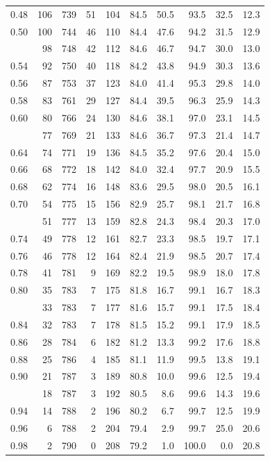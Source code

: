 \documentclass[
  11pt,
  letterpaper,
]{book}
\theoremstyle{definition}
\theoremstyle{definition}
\theoremstyle{definition}
\theoremstyle{remark}
\begin{document}
\begin{longtable}{rrrrrrrrrr}
0.48 & 106 & 739 & 51 & 104 & 84.5 & 50.5 & 93.5 & 32.5 & 12.3\\
0.50 & 100 & 744 & 46 & 110 & 84.4 & 47.6 & 94.2 & 31.5 & 12.9\\
\addlinespace
0.52 & 98 & 748 & 42 & 112 & 84.6 & 46.7 & 94.7 & 30.0 & 13.0\\
0.54 & 92 & 750 & 40 & 118 & 84.2 & 43.8 & 94.9 & 30.3 & 13.6\\
0.56 & 87 & 753 & 37 & 123 & 84.0 & 41.4 & 95.3 & 29.8 & 14.0\\
0.58 & 83 & 761 & 29 & 127 & 84.4 & 39.5 & 96.3 & 25.9 & 14.3\\
0.60 & 80 & 766 & 24 & 130 & 84.6 & 38.1 & 97.0 & 23.1 & 14.5\\
\addlinespace
0.62 & 77 & 769 & 21 & 133 & 84.6 & 36.7 & 97.3 & 21.4 & 14.7\\
0.64 & 74 & 771 & 19 & 136 & 84.5 & 35.2 & 97.6 & 20.4 & 15.0\\
0.66 & 68 & 772 & 18 & 142 & 84.0 & 32.4 & 97.7 & 20.9 & 15.5\\
0.68 & 62 & 774 & 16 & 148 & 83.6 & 29.5 & 98.0 & 20.5 & 16.1\\
0.70 & 54 & 775 & 15 & 156 & 82.9 & 25.7 & 98.1 & 21.7 & 16.8\\
\addlinespace
0.72 & 51 & 777 & 13 & 159 & 82.8 & 24.3 & 98.4 & 20.3 & 17.0\\
0.74 & 49 & 778 & 12 & 161 & 82.7 & 23.3 & 98.5 & 19.7 & 17.1\\
0.76 & 46 & 778 & 12 & 164 & 82.4 & 21.9 & 98.5 & 20.7 & 17.4\\
0.78 & 41 & 781 & 9 & 169 & 82.2 & 19.5 & 98.9 & 18.0 & 17.8\\
0.80 & 35 & 783 & 7 & 175 & 81.8 & 16.7 & 99.1 & 16.7 & 18.3\\
\addlinespace
0.82 & 33 & 783 & 7 & 177 & 81.6 & 15.7 & 99.1 & 17.5 & 18.4\\
0.84 & 32 & 783 & 7 & 178 & 81.5 & 15.2 & 99.1 & 17.9 & 18.5\\
0.86 & 28 & 784 & 6 & 182 & 81.2 & 13.3 & 99.2 & 17.6 & 18.8\\
0.88 & 25 & 786 & 4 & 185 & 81.1 & 11.9 & 99.5 & 13.8 & 19.1\\
0.90 & 21 & 787 & 3 & 189 & 80.8 & 10.0 & 99.6 & 12.5 & 19.4\\
\addlinespace
0.92 & 18 & 787 & 3 & 192 & 80.5 & 8.6 & 99.6 & 14.3 & 19.6\\
0.94 & 14 & 788 & 2 & 196 & 80.2 & 6.7 & 99.7 & 12.5 & 19.9\\
0.96 & 6 & 788 & 2 & 204 & 79.4 & 2.9 & 99.7 & 25.0 & 20.6\\
0.98 & 2 & 790 & 0 & 208 & 79.2 & 1.0 & 100.0 & 0.0 & 20.8\\
\bottomrule
\end{longtable}
\end{document}
